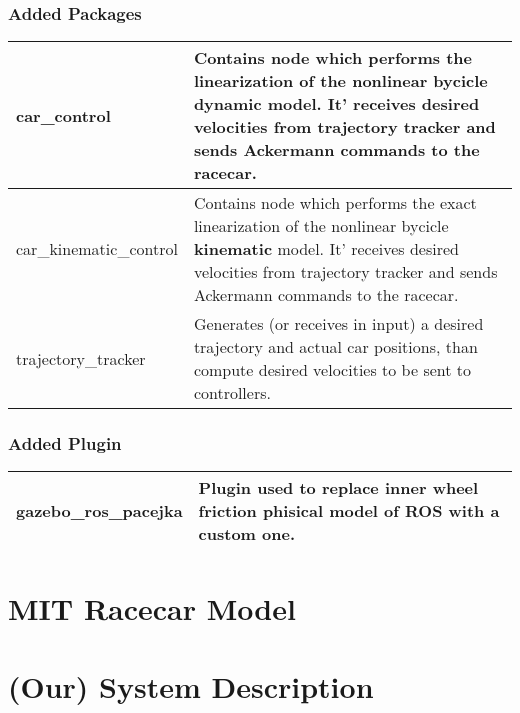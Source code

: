 \documentclass[12pt, letterpaper]{report}
\begin{document}
\subsection{Added Packages}

\begin{center}
	\begin{tabularx}{\textwidth}{
			| >{\raggedright\arraybackslash}X
			| >{\raggedright\arraybackslash}X |
		}
		\hline
		car\_control & Contains node which performs the linearization of the nonlinear bycicle \textbf{dynamic} model. It' receives desired velocities from trajectory tracker and sends Ackermann commands to the racecar. \\
		\hline
		car\_kinematic\_control & Contains node which performs the exact linearization of the nonlinear bycicle \textbf{kinematic} model. It' receives desired velocities from trajectory tracker and sends Ackermann commands to the racecar. \\
		\hline
		trajectory\_tracker & Generates (or receives in input) a desired trajectory and actual car positions, than compute desired velocities to be sent to controllers. \\
		\hline
	\end{tabularx}
\end{center}

\subsection{Added Plugin}

\begin{center}
	\begin{tabularx}{\textwidth}{
			| >{\raggedright\arraybackslash}X
			| >{\raggedright\arraybackslash}X |
		}
		\hline
		gazebo\_ros\_pacejka & Plugin used to replace inner wheel friction phisical model of ROS with a custom one. \\
		\hline
	\end{tabularx}
\end{center}


\newpage
\chapter{MIT Racecar Model}


\newpage
\chapter{(Our) System Description}
\end{document}
